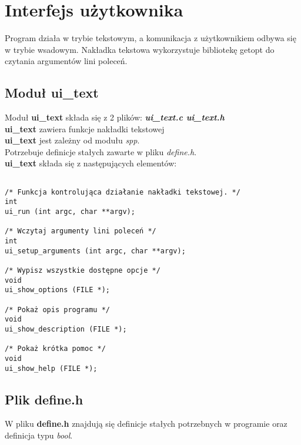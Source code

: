 \documentclass[bibtotocnumbered, headsepline,normalheadings,12pt,polish]{scrreprt}
\begin{document}
\section{Interfejs użytkownika}
Program działa w trybie tekstowym, a komunikacja z użytkownikiem odbywa się w trybie wsadowym. Nakładka tekstowa wykorzystuje bibliotekę getopt do czytania argumentów lini poleceń.
\subsection{Moduł ui\_text}
\normalsize
Moduł \textbf{ui\_text} składa się z 2 plików: \textit{\textbf{ui\_text.c ui\_text.h}}\\
\textbf{ui\_text} zawiera funkcje nakładki tekstowej\\
\textbf{ui\_text} jest zależny od \large modułu \emph{spp}.\large\\
Potrzebuje definicje stałych zawarte w pliku \large\emph{define.h}.\large\\

\textbf{ui\_text} składa się z następujących elementów:
\begin{verbatim}

/* Funkcja kontrolująca działanie nakładki tekstowej. */
int 
ui_run (int argc, char **argv);

/* Wczytaj argumenty lini poleceń */
int 
ui_setup_arguments (int argc, char **argv);

/* Wypisz wszystkie dostępne opcje */
void 
ui_show_options (FILE *);

/* Pokaż opis programu */
void 
ui_show_description (FILE *);

/* Pokaż krótka pomoc */
void 
ui_show_help (FILE *);

\end{verbatim}
\subsection{Plik define.h}
\large
W pliku \textbf{define.h} znajdują się definicje stałych potrzebnych w programie oraz definicja typu \textit{bool}.
\end{document}
